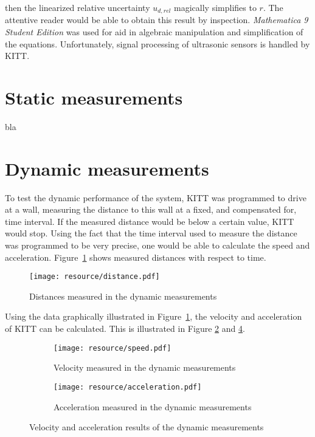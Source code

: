 \documentclass[11pt,titlepage]{report}
\begin{document}
then the linearized relative uncertainty $u_{d,rel}$ magically simplifies to $r$. The attentive reader would be able to obtain this result by inspection. \textit{Mathematica 9 Student Edition} was used for aid in algebraic manipulation and simplification of the equations. Unfortunately, signal processing of ultrasonic sensors is handled by KITT.

\section{Static measurements}
bla

\section{Dynamic measurements}
To test the dynamic performance of the system, KITT was programmed to drive at a wall, measuring the distance to this wall at a fixed, and compensated for, time interval. If the measured distance would be below a certain value, KITT would stop. Using the fact that the time interval used to measure the distance was programmed to be very precise, one would be able to calculate the speed and acceleration. Figure~\ref{fig:ass-2-dyn-dist} shows measured distances with respect to time.

\begin{figure}[H]
	\begin{center}
		\texttt{[image: resource/distance.pdf]}
	\end{center}
	\caption{Distances measured in the dynamic measurements}
	\label{fig:ass-2-dyn-dist}
\end{figure}

Using the data graphically illustrated in Figure~\ref{fig:ass-2-dyn-dist}, the velocity and acceleration of KITT can be calculated. This is illustrated in Figure \ref{fig:ass-2-dyn-vel} and \ref{fig:ass-2-dyn-acc}.

\begin{figure}[H]
	\begin{subfigure}{.5\textwidth}
		\begin{center}
			\texttt{[image: resource/speed.pdf]}
		\end{center}
		\caption{Velocity measured in the dynamic measurements}
		\label{fig:ass-2-dyn-vel}
	\end{subfigure}
	\begin{subfigure}{.5\textwidth}
		\begin{center}
			\texttt{[image: resource/acceleration.pdf]}
		\end{center}
		\caption{Acceleration measured in the dynamic measurements}
		\label{fig:ass-2-dyn-acc}
	\end{subfigure}
	\caption{Velocity and acceleration results of the dynamic measurements}
\end{figure}
\end{document}
